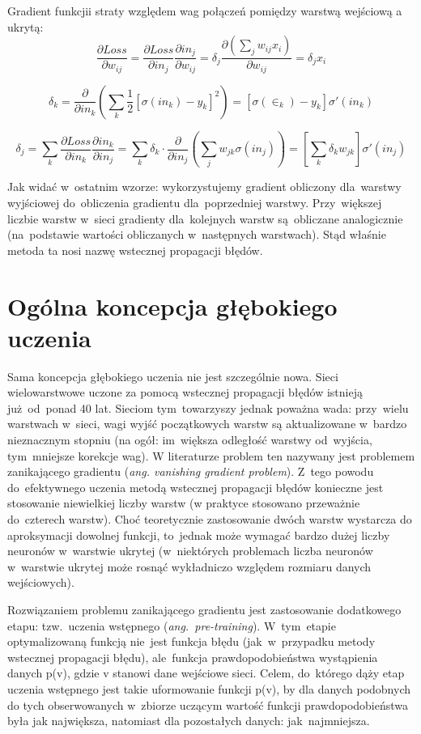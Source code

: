 Gradient funkcjii straty względem wag połączeń pomiędzy warstwą wejściową a ukrytą: 
$$ \frac{\partial Loss}{\partial w_{ij}}=\frac{\partial Loss}{\partial in_j}\frac{\partial in_j}{\partial
w_{ij}} = \delta_j \frac{\partial (\sum\limits_j w_{ij}x_i)}{\partial w_{ij}} = \delta_j x_i $$

$$ \delta_k = \frac{\partial}{\partial in_k}(\sum\limits_k \frac{1}{2}
[\sigma(in_k)-y_k]^2)=[\sigma(\in_k)-y_k]\sigma'(in_k)$$

$$ \delta_j = \sum\limits_k\frac{\partial Loss}{\partial in_k}\frac{\partial in_k}{\partial
in_j}=\sum\limits_k \delta_k \cdot \frac{\partial}{\partial in_j}(\sum\limits_j w_{jk}\sigma(in_j))=[\sum\limits_k \delta_k
w_{jk}]\sigma'(in_j)$$

Jak widać w~ostatnim wzorze: wykorzystujemy gradient obliczony dla~warstwy wyjściowej
do~obliczenia gradientu dla~poprzedniej warstwy. Przy~większej liczbie warstw w~sieci gradienty
dla~kolejnych warstw są~obliczane analogicznie (na~podstawie wartości obliczanych w~następnych warstwach).
Stąd właśnie metoda ta nosi nazwę wstecznej propagacji błędów.


\section{Ogólna koncepcja głębokiego uczenia}
Sama koncepcja głębokiego uczenia nie jest szczególnie nowa. Sieci
wielowarstwowe uczone za pomocą wstecznej propagacji błędów istnieją
już~od~ponad 40 lat. Sieciom tym~towarzyszy jednak poważna wada: przy~wielu
warstwach w~sieci, wagi wyjść początkowych warstw są aktualizowane w~bardzo
nieznacznym stopniu (na ogół: im~większa odległość warstwy od~wyjścia,
tym~mniejsze korekcje wag). W literaturze problem ten nazywany jest problemem
zanikającego gradientu (\textit{ang. vanishing gradient problem}). Z~tego
powodu do~efektywnego uczenia metodą wstecznej propagacji błędów konieczne jest
stosowanie niewielkiej liczby warstw (w praktyce stosowano przeważnie
do~czterech warstw). Choć teoretycznie zastosowanie dwóch warstw
wystarcza do aproksymacji dowolnej funkcji, to~jednak może wymagać bardzo dużej
liczby neuronów w~warstwie ukrytej (w~niektórych problemach liczba neuronów w~warstwie ukrytej może rosnąć
wykładniczo względem rozmiaru danych wejściowych).

Rozwiązaniem problemu zanikającego gradientu jest zastosowanie dodatkowego
etapu: tzw.~uczenia wstępnego (\textit{ang.~pre-training}). W~tym~etapie
optymalizowaną funkcją nie~jest funkcja błędu (jak~w~przypadku metody wstecznej
propagacji błędu), ale~funkcja prawdopodobieństwa wystąpienia danych p(v),
gdzie v stanowi dane wejściowe sieci. Celem, do~którego dąży etap uczenia
wstępnego jest takie uformowanie funkcji p(v), by dla danych podobnych do tych obserwowanych w~zbiorze
uczącym wartość funkcji prawdopodobieństwa była jak największa, natomiast dla pozostałych danych:
jak~najmniejsza.

